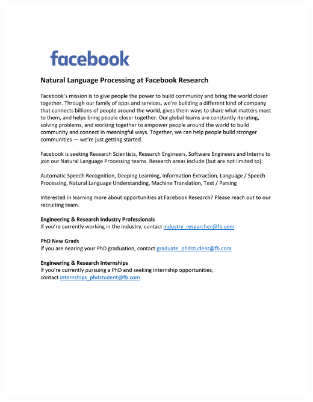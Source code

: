 \thispagestyle{empty}
\begin{center}
  \vfill
  \includegraphics[width=\textwidth]{content/ads/full/facebook.pdf}
  \vfill
\end{center}
\clearpage


